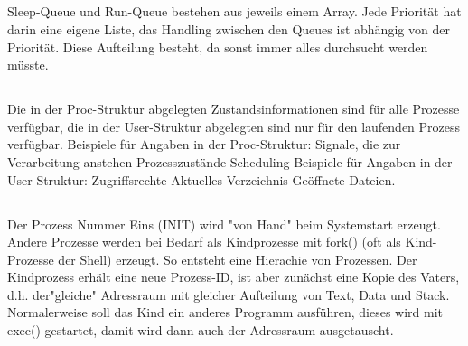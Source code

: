 \subsection{}
\begin{answer}
Sleep-Queue und Run-Queue bestehen aus jeweils einem Array. Jede Priorität hat darin
eine eigene Liste, das Handling zwischen den Queues ist abhängig von der Priorität. Diese
Aufteilung besteht, da sonst immer alles durchsucht werden müsste.
\end{answer}

\subsection{}
\begin{answer}
Die in der Proc-Struktur abgelegten Zustandsinformationen sind für alle Prozesse verfügbar,
die in der User-Struktur abgelegten sind nur für den laufenden Prozess verfügbar.
Beispiele für Angaben in der Proc-Struktur:
Signale, die zur Verarbeitung anstehen
Prozesszustände
Scheduling
Beispiele für Angaben in der User-Struktur:
Zugriffsrechte
Aktuelles Verzeichnis
Geöffnete Dateien.
\end{answer}

\subsection{}
\begin{answer}
Der Prozess Nummer Eins (INIT) wird "von Hand" beim Systemstart erzeugt.
Andere Prozesse werden bei Bedarf als Kindprozesse mit fork() (oft als Kind-Prozesse
der Shell) erzeugt. So entsteht eine Hierachie von Prozessen. Der Kindprozess erhält eine
neue Prozess-ID, ist aber zunächst eine Kopie des Vaters, d.h. der"gleiche" Adressraum
mit gleicher Aufteilung von Text, Data und Stack. Normalerweise soll das Kind ein anderes
Programm ausführen, dieses wird mit exec() gestartet, damit wird dann auch der
Adressraum ausgetauscht.
\end{answer}

